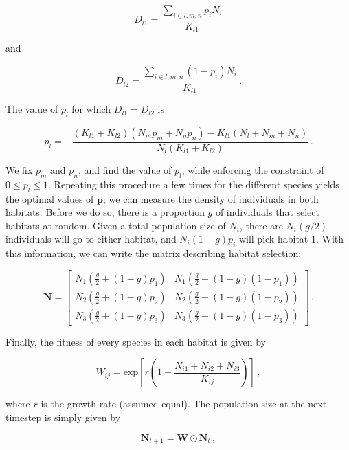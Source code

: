 \documentclass[10pt,a4paper,onecolumn]{article}
\begin{document}
\begin{equation}
D_{l1} = \frac{\sum_{i\in l,m,n}p_iN_i}{K_{l1}}
\end{equation}

and

\begin{equation}
D_{l2} = \frac{\sum_{i\in l,m,n}(1-p_i)N_i}{K_{l1}} \,.
\end{equation}

The value of \(p_l\) for which \(D_{l1}=D_{l2}\) is

\begin{equation}
p_l = - \frac{(K_{l1}+K_{l2})(N_mp_m+N_np_n)-K_{l1}(N_l+N_m+N_n)}{N_l(K_{l1}+K_{l2})} \,.
\end{equation}

We fix \(p_m\) and \(p_n\), and find the value of \(p_l\), while
enforcing the constraint of \(0 \leq p_l \leq 1\). Repeating this
procedure a few times for the different species yields the optimal
values of \(\mathbf{p}\); we can measure the density of individuals in
both habitats. Before we do so, there is a proportion \(g\) of
individuals that select habitats at random. Given a total population
size of \(N_i\), there are \(N_i(g/2)\) individuals will go to either
habitat, and \(N_i(1-g)p_i\) will pick habitat 1. With this information,
we can write the matrix describing habitat selection:

\begin{equation}
\mathbf{N} = \begin{bmatrix}
  N_1(\frac{g}{2}+(1-g)p_1) & N_1(\frac{g}{2}+(1-g)(1-p_1))\\
  N_2(\frac{g}{2}+(1-g)p_2) & N_2(\frac{g}{2}+(1-g)(1-p_2))\\
  N_3(\frac{g}{2}+(1-g)p_3) & N_3(\frac{g}{2}+(1-g)(1-p_3))
\end{bmatrix} \,.
\end{equation}

Finally, the fitness of every species in each habitat is given by

\begin{equation}
W_{ij} = \text{exp}\left[r\left(1-\frac{N_{i1}+N_{i2}+N_{i3}}{K_{ij}}\right)\right] \,,
\end{equation}

where \(r\) is the growth rate (assumed equal). The population size at
the next timestep is simply given by

\begin{equation}
\mathbf{N}_{t+1} = \mathbf{W}\odot \mathbf{N}_{t} \,,
\end{equation}
\end{document}
